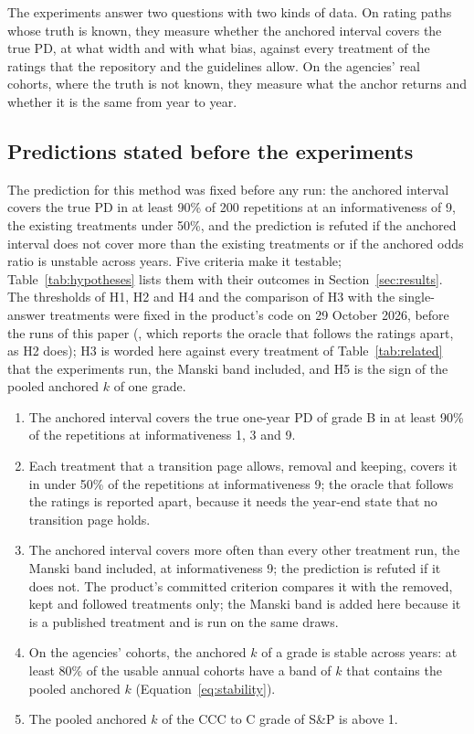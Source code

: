 The experiments answer two questions with two kinds of data. On rating paths whose truth is known, they measure whether the anchored interval covers the true PD, at what width and with what bias, against every treatment of the \wdn{} ratings that the repository and the guidelines allow. On the agencies' real cohorts, where the truth is not known, they measure what the anchor returns and whether it is the same from year to year.

\subsection{Predictions stated before the experiments}

The prediction for this method was fixed before any run: the anchored interval covers the true PD in at least 90\% of 200 repetitions at an informativeness of 9, the existing treatments under 50\%, and the prediction is refuted if the anchored interval does not cover more than the existing treatments or if the anchored odds ratio is unstable across years. Five criteria make it testable; Table~\ref{tab:hypotheses} lists them with their outcomes in Section~\ref{sec:results}. The thresholds of H1, H2 and H4 and the comparison of H3 with the single-answer treatments were fixed in the product's code on 29 October 2026, before the runs of this paper (, which reports the oracle that follows the \wdn{} ratings apart, as H2 does); H3 is worded here against every treatment of Table~\ref{tab:related} that the experiments run, the Manski band included, and H5 is the sign of the pooled anchored $k$ of one grade.
\begin{enumerate}
\item[\textbf{H1}] The anchored interval covers the true one-year PD of grade B in at least 90\% of the repetitions at informativeness 1, 3 and 9.
\item[\textbf{H2}] Each treatment that a transition page allows, removal and keeping, covers it in under 50\% of the repetitions at informativeness 9; the oracle that follows the \wdn{} ratings is reported apart, because it needs the year-end state that no transition page holds.
\item[\textbf{H3}] The anchored interval covers more often than every other treatment run, the Manski band included, at informativeness 9; the prediction is refuted if it does not. The product's committed criterion compares it with the removed, kept and followed treatments only; the Manski band is added here because it is a published treatment and is run on the same draws.
\item[\textbf{H4}] On the agencies' cohorts, the anchored $k$ of a grade is stable across years: at least 80\% of the usable annual cohorts have a band of $k$ that contains the pooled anchored $k$ (Equation~\eqref{eq:stability}).
\item[\textbf{H5}] The pooled anchored $k$ of the CCC to C grade of S\&P is above 1.
\end{enumerate}

